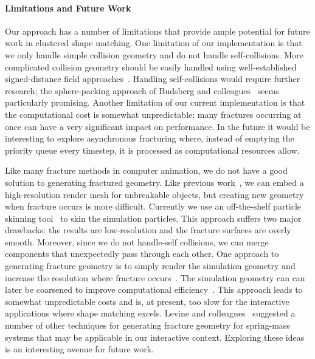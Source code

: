 \documentclass[review]{acmsiggraph}
\begin{document}

\paragraph{Limitations and Future Work}
Our approach has a number of limitations that provide ample potential for future work in clustered shape matching.
One limitation of our implementation is that we only handle simple collision geometry and do not handle self-collisions.
More complicated collision geometry should be easily handled using well-established signed-distance field approaches~\cite{Guendelman:2003:NRB}.
Handling self-collisions would require further research; the sphere-packing approach of Budsberg and colleagues~
seems particularly promising.  
Another limitation of our current implementation is that the computational cost is somewhat unpredictable; many fractures occurring at once
can have a very significant impact on performance.  In the future it would be interesting to explore asynchronous fracturing
where, instead of emptying the priority queue every timestep, it is processed as computational resources allow.

Like many fracture methods in computer animation, we do not have a good solution to generating fractured
geometry.  Like previous work~\cite{Mueller:2005:MDB,Rivers:2007:FFL}, we can embed a high-resolution 
render mesh for unbreakable objects, but creating new geometry when fracture occurs is more difficult.  
Currently we use an off-the-shelf particle skinning tool~\cite{Bhattacharya:2015:ALM} to skin the simulation particles.
This approach suffers two major drawbacks: the results are low-resolution and the fracture surfaces are overly smooth.  
Moreover, since we do not handle-self collisions, we can merge components that unexpectedly pass through each other.
One approach to generating fracture geometry is to simply render the simulation geometry and increase the resolution 
where fracture occurs~\cite{Obrien:1999:GMA,Obrien:2002:GMA}.  The simulation geometry can can later be 
coarsened to improve computational efficiency~\cite{Pfaff:2014:ATC}.  This approach leads to
somewhat unpredictable costs and is, at present, too slow for the interactive applications where shape matching excels.
Levine and colleagues~ suggested a number of other techniques for generating fracture geometry
for spring-mass systems that may be applicable in our interactive context.  Exploring these ideas is an interesting avenue 
for future work.
\end{document}
